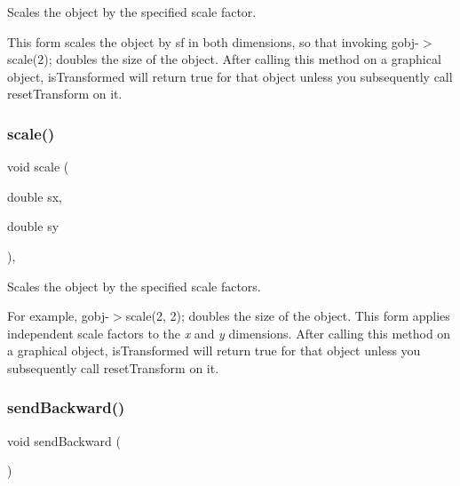 Scales the object by the specified scale factor. 

This form scales the object by {\ttfamily sf} in both dimensions, so that invoking {\ttfamily gobj-\/$>$scale(2);} doubles the size of the object. After calling this method on a graphical object, {\ttfamily is\+Transformed} will return {\ttfamily true} for that object unless you subsequently call {\ttfamily reset\+Transform} on it. \mbox{\label{classsgl_1_1GObject_a63641f69d610d0b951357d35a0c3b1e3}} 
\subsubsection{\texorpdfstring{scale()}{scale()}\hspace{0.1cm}{\footnotesize\ttfamily [2/2]}}
{\footnotesize\ttfamily void scale (\begin{DoxyParamCaption}\item[{double}]{sx,  }\item[{double}]{sy }\end{DoxyParamCaption})\hspace{0.3cm}{\ttfamily [virtual]}, {\ttfamily [inherited]}}



Scales the object by the specified scale factors. 

For example, {\ttfamily gobj-\/$>$scale(2, 2);} doubles the size of the object. This form applies independent scale factors to the {\itshape x} and {\itshape y} dimensions. After calling this method on a graphical object, {\ttfamily is\+Transformed} will return {\ttfamily true} for that object unless you subsequently call {\ttfamily reset\+Transform} on it. \mbox{\label{classsgl_1_1GObject_ab6747f40313c531c2db32edb5b63b9b7}} 
\subsubsection{\texorpdfstring{send\+Backward()}{sendBackward()}}
{\footnotesize\ttfamily void send\+Backward (\begin{DoxyParamCaption}{ }\end{DoxyParamCaption})\hspace{0.3cm}{\ttfamily [inherited]}}



